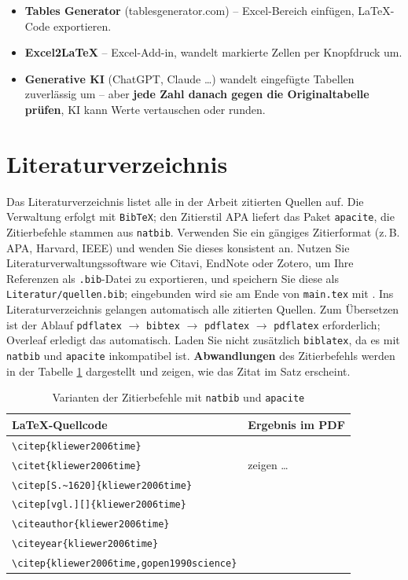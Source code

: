 \begin{itemize}
  \item \textbf{Tables Generator} (tablesgenerator.com) -- Excel-Bereich einfügen, LaTeX-Code exportieren.
  \item \textbf{Excel2LaTeX} -- Excel-Add-in, wandelt markierte Zellen per Knopfdruck um.
  \item \textbf{Generative KI} (ChatGPT, Claude \dots) wandelt eingefügte Tabellen zuverlässig um -- aber \textbf{jede Zahl danach gegen die Originaltabelle prüfen}, KI kann Werte vertauschen oder runden.
\end{itemize}

\section{Literaturverzeichnis}

Das Literaturverzeichnis listet alle in der Arbeit zitierten Quellen auf. Die Verwaltung erfolgt mit \texttt{BibTeX}; den Zitierstil APA liefert das Paket \texttt{apacite}, die Zitierbefehle stammen aus \texttt{natbib}. Verwenden Sie ein gängiges Zitierformat (z.\,B. APA, Harvard, IEEE) und wenden Sie dieses konsistent an. Nutzen Sie Literaturverwaltungssoftware wie Citavi, EndNote oder Zotero, um Ihre Referenzen als \texttt{.bib}-Datei zu exportieren, und speichern Sie diese als \texttt{Literatur/quellen.bib}; eingebunden wird sie am Ende von \texttt{main.tex} mit \verb||. Ins Literaturverzeichnis gelangen automatisch alle zitierten Quellen. Zum Übersetzen ist der Ablauf \texttt{pdflatex} $\rightarrow$ \texttt{bibtex} $\rightarrow$ \texttt{pdflatex} $\rightarrow$ \texttt{pdflatex} erforderlich; Overleaf erledigt das automatisch. Laden Sie nicht zusätzlich \texttt{biblatex}, da es mit \texttt{natbib} und \texttt{apacite} inkompatibel ist. \textbf{Abwandlungen} des Zitierbefehls werden in der Tabelle \ref{tab:cite} dargestellt und zeigen, wie das Zitat im Satz erscheint.

\begin{table}[htbp]
\centering
\footnotesize
\caption{Varianten der Zitierbefehle mit \texttt{natbib} und \texttt{apacite}}
\label{tab:cite}
\begin{tabular}{@{}ll@{}}
\toprule
\textbf{LaTeX-Quellcode} & \textbf{Ergebnis im PDF} \\
\midrule
\verb|\citep{kliewer2006time}| & \citep{kliewer2006time} \\
\verb|\citet{kliewer2006time}| & \citet{kliewer2006time} zeigen \dots \\
\verb|\citep[S.~1620]{kliewer2006time}| & \citep[S.~1620]{kliewer2006time} \\
\verb|\citep[vgl.][]{kliewer2006time}| & \citep[vgl.][]{kliewer2006time} \\
\verb|\citeauthor{kliewer2006time}| & \citeauthor{kliewer2006time} \\
\verb|\citeyear{kliewer2006time}| & \citeyear{kliewer2006time} \\
\verb|\citep{kliewer2006time,gopen1990science}| & \citep{kliewer2006time,gopen1990science} \\
\bottomrule
\end{tabular}
\end{table}

